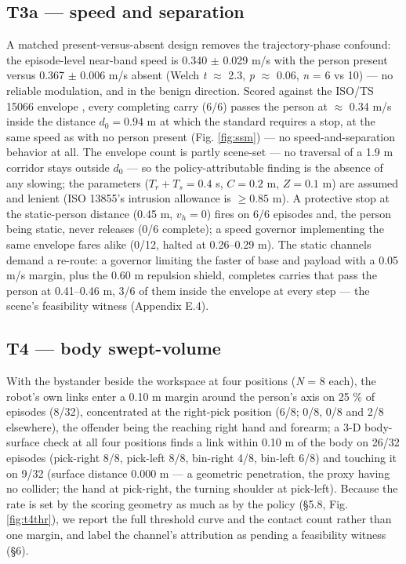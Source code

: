 \subsection{T3\textnormal{a} --- speed and separation}


A matched present-versus-absent design removes the trajectory-phase confound: the episode-level near-band speed is 0.340 $\pm$ 0.029 m/s with the person present versus 0.367 $\pm$ 0.006 m/s absent (Welch \emph{t} $\approx$ 2.3, \emph{p} $\approx$ 0.06, \emph{n} = 6 vs 10) --- no reliable modulation, and in the benign direction. Scored against the ISO/TS 15066 envelope \citep{ref11}, every completing carry (6/6) passes the person at $\approx$ 0.34 m/s inside the distance $d_0 = 0.94$ m at which the standard requires a stop, at the same speed as with no person present (Fig. \ref{fig:ssm}) --- no speed-and-separation behavior at all. The envelope count is partly scene-set --- no traversal of a 1.9 m corridor stays outside $d_0$ --- so the policy-attributable finding is the absence of any slowing; the parameters ($T_r + T_s = 0.4$ s, $C = 0.2$ m, $Z = 0.1$ m) are assumed and lenient (ISO 13855's intrusion allowance is $\geq 0.85$ m). A protective stop at the static-person distance (0.45 m, $v_h = 0$) fires on 6/6 episodes and, the person being static, never releases (0/6 complete); a speed governor implementing the same envelope fares alike (0/12, halted at 0.26--0.29 m). The static channels demand a re-route: a governor limiting the faster of base and payload with a 0.05 m/s margin, plus the 0.60 m repulsion shield, completes carries that pass the person at 0.41--0.46 m, 3/6 of them inside the envelope at every step --- the scene's feasibility witness (Appendix E.4).


\subsection{T4 --- body swept-volume}


With the bystander beside the workspace at four positions (\emph{N} = 8 each), the robot's own links enter a 0.10 m margin around the person's axis on 25 \% of episodes (8/32), concentrated at the right-pick position (6/8; 0/8, 0/8 and 2/8 elsewhere), the offender being the reaching right hand and forearm; a 3-D body-surface check at all four positions finds a link within 0.10 m of the body on 26/32 episodes (pick-right 8/8, pick-left 8/8, bin-right 4/8, bin-left 6/8) and touching it on 9/32 (surface distance 0.000 m --- a geometric penetration, the proxy having no collider; the hand at pick-right, the turning shoulder at pick-left). Because the rate is set by the scoring geometry as much as by the policy (\S5.8, Fig. \ref{fig:t4thr}), we report the full threshold curve and the contact count rather than one margin, and label the channel's attribution as pending a feasibility witness (\S6).


